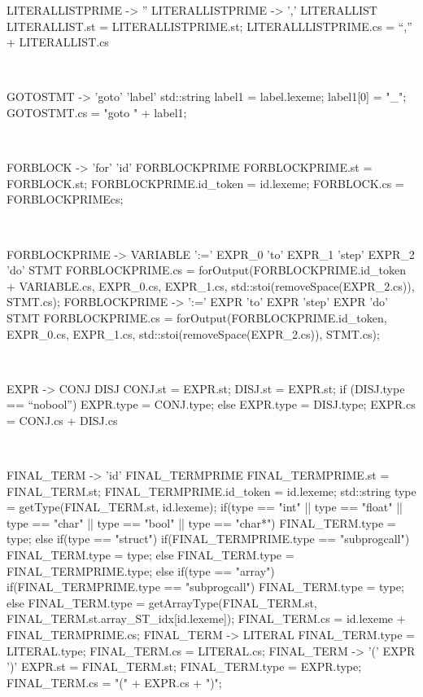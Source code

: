 \begin{verbbox}[\scriptsize]
LITERALLISTPRIME -> '' {}
LITERALLISTPRIME -> ',' LITERALLIST
{
LITERALLIST.st = LITERALLISTPRIME.st;
LITERALLLISTPRIME.cs = “,” + LITERALLIST.cs
}
\end{verbbox} 
\theverbbox\\

\begin{verbbox}[\scriptsize]
GOTOSTMT -> 'goto' 'label'
{ 
std::string label1 =  label.lexeme;
label1[0] = "_";
GOTOSTMT.cs = "goto " + label1;
}
\end{verbbox} 
\theverbbox\\

\begin{verbbox}[\scriptsize]
FORBLOCK -> 'for' 'id' FORBLOCKPRIME
{
FORBLOCKPRIME.st = FORBLOCK.st;
FORBLOCKPRIME.id_token = id.lexeme;
FORBLOCK.cs = FORBLOCKPRIMEcs;
}
\end{verbbox} 
\theverbbox\\

\begin{verbbox}[\scriptsize]
FORBLOCKPRIME -> VARIABLE ':=' EXPR\_0 'to' EXPR\_1 'step' EXPR\_2 'do' STMT
{
FORBLOCKPRIME.cs = forOutput(FORBLOCKPRIME.id_token + VARIABLE.cs, EXPR_0.cs, EXPR_1.cs,
    std::stoi(removeSpace(EXPR_2.cs)), STMT.cs);
}
FORBLOCKPRIME -> ':=' EXPR 'to' EXPR 'step' EXPR 'do' STMT
{
FORBLOCKPRIME.cs = forOutput(FORBLOCKPRIME.id_token, EXPR_0.cs, EXPR_1.cs,
    std::stoi(removeSpace(EXPR_2.cs)), STMT.cs);
}
\end{verbbox} 
\theverbbox\\

\begin{verbbox}[\scriptsize]
EXPR -> CONJ DISJ
{
CONJ.st = EXPR.st;
DISJ.st = EXPR.st;
if (DISJ.type == “nobool”) {
    EXPR.type = CONJ.type;
} else {
	EXPR.type = DISJ.type;
}
EXPR.cs = CONJ.cs + DISJ.cs
}
\end{verbbox} 
\theverbbox\\

\begin{verbbox}[\scriptsize]
FINAL_TERM -> 'id' FINAL_TERMPRIME
{
FINAL_TERMPRIME.st = FINAL_TERM.st;
FINAL_TERMPRIME.id_token = id.lexeme;
std::string type = getType(FINAL_TERM.st, id.lexeme);
if(type == "int" || type == "float" || type == "char" ||     type == "bool" || type == "char*") {
    FINAL_TERM.type = type;
} else if(type == "struct") {
    if(FINAL_TERMPRIME.type == "subprogcall") {
        FINAL_TERM.type = type;
    } else {
        FINAL_TERM.type = FINAL_TERMPRIME.type;
    }
} else if(type == "array") {
    if(FINAL_TERMPRIME.type == "subprogcall") {
        FINAL_TERM.type = type;
    } else {
        FINAL_TERM.type = getArrayType(FINAL_TERM.st, FINAL_TERM.st.array_ST_idx[id.lexeme]);
    }
}
FINAL_TERM.cs = id.lexeme + FINAL_TERMPRIME.cs;
}
FINAL_TERM -> LITERAL
{
FINAL_TERM.type = LITERAL.type;
FINAL_TERM.cs = LITERAL.cs;
}
FINAL_TERM -> '(' EXPR ')'
{
EXPR.st = FINAL_TERM.st;
FINAL_TERM.type = EXPR.type;
FINAL_TERM.cs = "(" + EXPR.cs + ")";
}
\end{verbbox} 
\theverbbox\\

